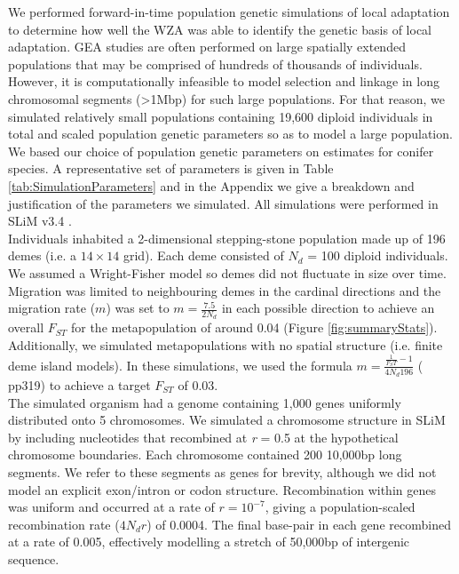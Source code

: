 \documentclass[10pt,twoside,lineno]{GSA_format}
\begin{document}
We performed forward-in-time population genetic simulations of local adaptation to determine how well the WZA was able to identify the genetic basis of local adaptation. GEA studies are often performed on large spatially extended populations that may be comprised of hundreds of thousands of individuals. However, it is computationally infeasible to model selection and linkage in long chromosomal segments (>1Mbp) for such large populations. For that reason, we simulated relatively small populations containing 19,600 diploid individuals in total and scaled population genetic parameters so as to model a large population. We based our choice of population genetic parameters on estimates for conifer species. A representative set of parameters is given in Table \ref{tab:SimulationParameters} and in the Appendix we give a breakdown and justification of the parameters we simulated. All simulations were performed in SLiM v3.4 \cite{Haller2019}. \\

Individuals inhabited a 2-dimensional stepping-stone population made up of 196 demes (i.e. a $14\times14$ grid). Each deme consisted of $N_d$ = 100 diploid individuals. We assumed a Wright-Fisher model so demes did not fluctuate in size over time. Migration was limited to neighbouring demes in the cardinal directions and the migration rate ($m$) was set to $m = \frac{7.5}{2N_d}$ in each possible direction to achieve an overall $F_{ST}$ for the metapopulation of around 0.04 (Figure \ref{fig:summaryStats}). Additionally, we simulated metapopulations with no spatial structure (i.e. finite deme island models). In these simulations, we used the formula $m = \frac{\frac{1}{F_ST} - 1}{4N_d196}$ (\citeauthor{RN173} \citeyear{RN173} pp319) to achieve a target $F_{ST}$ of 0.03.\\

The simulated organism had a genome containing 1,000 genes uniformly distributed onto 5 chromosomes. We simulated a chromosome structure in SLiM by including nucleotides that recombined at \textit{r} = 0.5 at the hypothetical chromosome boundaries. Each chromosome contained 200 10,000bp long segments. We refer to these segments as genes for brevity, although we did not model an explicit exon/intron or codon structure. Recombination within genes was uniform and occurred at a rate of $r = 10^{-7}$, giving a population-scaled recombination rate ($4N_dr$) of 0.0004. The final base-pair in each gene recombined at a rate of 0.005, effectively modelling a stretch of 50,000bp of intergenic sequence. \\
\end{document}
